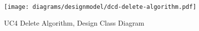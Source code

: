 \begin{figure}[p]%
\end{figure}
\begin{figure}[H]
    \centering
    \texttt{[image: diagrams/designmodel/dcd-delete-algorithm.pdf]}
    \caption{UC4 Delete Algorithm, Design Class Diagram}
    \label{fig:delete-algorithm-dcd}
\end{figure}
\newpage
% 
